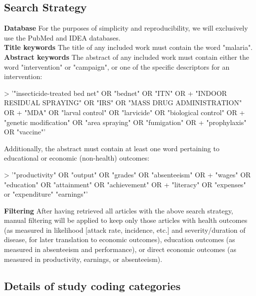\documentclass{article}
\begin{document}
\subsection*{Search Strategy}

\noindent \textbf{Database} For the purposes of simplicity and reproducibility, we will exclusively use the PubMed and IDEA databases. \\

\noindent \textbf{Title keywords} The title of any included work must contain the word "malaria". \\

\noindent \textbf{Abstract keywords} The abstract of any included work must contain either the word "intervention" or "campaign", or one of the specific descriptors for an intervention:  

\begin{Schunk}
\begin{Sinput}
> '"insecticide-treated bed net" OR "bednet" OR "ITN" OR 
+ "INDOOR RESIDUAL SPRAYING" OR "IRS" OR "MASS DRUG ADMINISTRATION" OR 
+ "MDA" OR "larval control" OR "larvicide" OR "biological control" OR 
+ "genetic modification" OR "area spraying" OR "fumigation" OR 
+ "prophylaxis" OR "vaccine"'
\end{Sinput}
\end{Schunk}

Additionally, the abstract must contain at least one word pertaining to educational or economic (non-health) outcomes:

\begin{Schunk}
\begin{Sinput}
> '"productivity" OR "output" OR "grades" OR "absenteeism" OR 
+ "wages" OR "education" OR "attainment" OR "achievement" OR 
+ "literacy" OR "expenses" or "expenditure" "earnings"'
\end{Sinput}
\end{Schunk}


\noindent \textbf{Filtering} After having retrieved all articles with the above search strategy, manual filtering will be applied to keep only those articles with health outcomes (as measured in likelihood [attack rate, incidence, etc.] and severity/duration of disease, for later translation to economic outcomes), education outcomes (as measured in absenteeism and performance), or direct economic outcomes (as measured in productivity, earnings, or absenteeism).

\subsection*{Details of study coding categories} 
\end{document}
